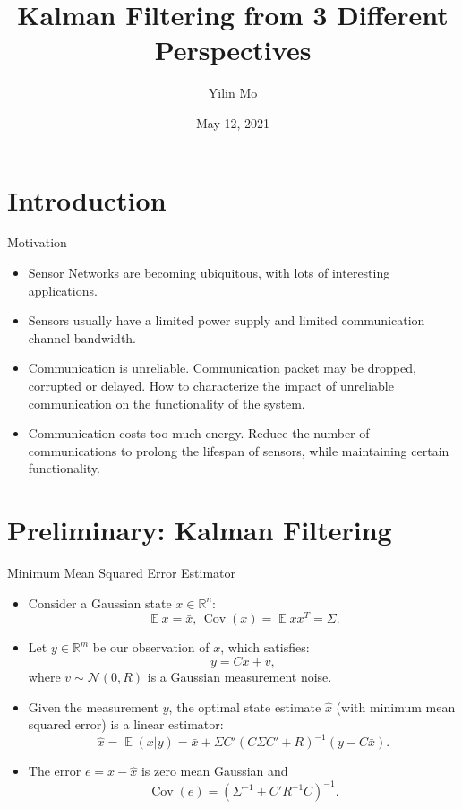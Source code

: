 \documentclass[10pt]{beamer}
\title[Kalman Filter]{Kalman Filtering from 3 Different Perspectives}
\author[Yilin Mo]{Yilin Mo}
\institute[Tsinghua]{Department of Automation, Tsinghua University}
\date[May 12, 2021]{May 12, 2021}
\DeclareMathOperator{\Cov}{Cov}
\DeclareMathOperator{\E}{\mathbb E}
\begin{document}
\begin{frame}
  \titlepage
\end{frame}

\section{Introduction}
\begin{frame}{Motivation}
  \begin{itemize}
    \item Sensor Networks are becoming ubiquitous, with lots of interesting applications.
    \item Sensors usually have a limited power supply and limited communication channel bandwidth.
    \item Communication is unreliable. Communication packet may be dropped, corrupted or delayed. How to characterize the impact of unreliable communication on the functionality of the system.
    \item Communication costs too much energy. Reduce the number of communications to prolong the lifespan of sensors, while maintaining certain functionality. 
  \end{itemize}
\end{frame}

\section{Preliminary: Kalman Filtering}
\frame{\tableofcontents}
\begin{frame}{Minimum Mean Squared Error Estimator}
  \begin{itemize}
    \item Consider a Gaussian state $x\in \mathbb R^n$:
      \begin{displaymath}
	\E x = \bar x,\,\Cov(x) = \E xx^T = \Sigma.
      \end{displaymath}
    \item Let $y\in\mathbb R^m$ be our observation of $x$, which satisfies:
      \begin{displaymath}
	y = C x + v,
      \end{displaymath}
      where $v\sim \mathcal N(0,R)$ is a Gaussian measurement noise. 
    \item Given the measurement $y$, the optimal state estimate $\hat x$ (with minimum mean squared error) is a linear estimator:
      \begin{displaymath}
	\hat x = \E (x|y) = \bar x + \Sigma C'(C\Sigma C'+R)^{-1}(y-C\bar x).
      \end{displaymath}
    \item The error $e = x - \hat x$ is zero mean Gaussian and
      \begin{displaymath}
	\Cov(e) = (\Sigma^{-1} +  C'  R^{-1}C)^{-1}.
      \end{displaymath}
  \end{itemize}
\end{frame}
\end{document}
